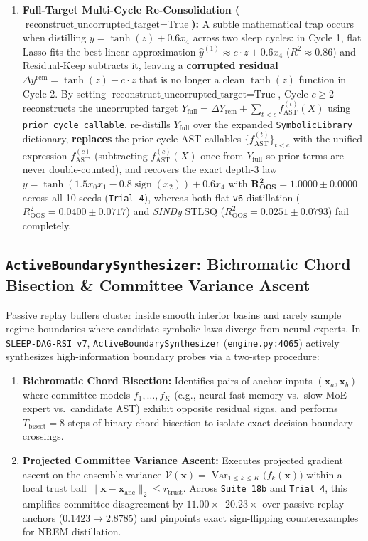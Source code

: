 \documentclass[11pt,a4paper]{article}
\begin{document}
\begin{enumerate}
\item \textbf{Full-Target Multi-Cycle Re-Consolidation ($\text{reconstruct\_uncorrupted\_target}=\text{True}$):}
A subtle mathematical trap occurs when distilling $y = \tanh(z) + 0.6 x_4$ across two sleep cycles: in Cycle 1, flat Lasso fits the best linear approximation $\hat{y}^{(1)} \approx c \cdot z + 0.6 x_4$ ($R^2 \approx 0.86$) and Residual-Keep subtracts it, leaving a \textbf{corrupted residual} $\Delta y^{\text{rem}} = \tanh(z) - c \cdot z$ that is no longer a clean $\tanh(z)$ function in Cycle 2. By setting $\text{reconstruct\_uncorrupted\_target}=\text{True}$, Cycle $c \ge 2$ reconstructs the uncorrupted target $Y_{\text{full}} = \Delta Y_{\text{rem}} + \sum_{t < c} f_{\text{AST}}^{(t)}(X)$ using \texttt{prior\_cycle\_callable}, re-distills $Y_{\text{full}}$ over the expanded \texttt{SymbolicLibrary} dictionary, \textbf{replaces} the prior-cycle AST callables $\{f_{\text{AST}}^{(t)}\}_{t < c}$ with the unified expression $f_{\text{AST}}^{(c)}$ (subtracting $f_{\text{AST}}^{(c)}(X)$ once from $Y_{\text{full}}$ so prior terms are never double-counted), and recovers the exact depth-3 law $y = \tanh(1.5 x_0 x_1 - 0.8\operatorname{sign}(x_2)) + 0.6 x_4$ with $\mathbf{R^2_{\text{OOS}} = 1.0000 \pm 0.0000}$ across all 10 seeds (\texttt{Trial 4}), whereas both flat \texttt{v6} distillation ($R^2_{\text{OOS}} = 0.0400 \pm 0.0717$) and \emph{SINDy} STLSQ ($R^2_{\text{OOS}} = 0.0251 \pm 0.0793$) fail completely.
\end{enumerate}

\subsection{\texttt{ActiveBoundarySynthesizer}: Bichromatic Chord Bisection \& Committee Variance Ascent}

Passive replay buffers cluster inside smooth interior basins and rarely sample regime boundaries where candidate symbolic laws diverge from neural experts. In \texttt{SLEEP-DAG-RSI v7}, \texttt{ActiveBoundarySynthesizer} (\texttt{engine.py:4065}) actively synthesizes high-information boundary probes via a two-step procedure:
\begin{enumerate}
\item \textbf{Bichromatic Chord Bisection:} Identifies pairs of anchor inputs $(\mathbf{x}_a, \mathbf{x}_b)$ where committee models $f_1, \dots, f_K$ (e.g., neural fast memory vs.\ slow MoE expert vs.\ candidate AST) exhibit opposite residual signs, and performs $T_{\text{bisect}} = 8$ steps of binary chord bisection to isolate exact decision-boundary crossings.
\item \textbf{Projected Committee Variance Ascent:} Executes projected gradient ascent on the ensemble variance $\mathcal{V}(\mathbf{x}) = \operatorname{Var}_{1 \le k \le K}\bigl(f_k(\mathbf{x})\bigr)$ within a local trust ball $\|\mathbf{x} - \mathbf{x}_{\text{anc}}\|_2 \le r_{\text{trust}}$. Across \texttt{Suite 18b} and \texttt{Trial 4}, this amplifies committee disagreement by $\mathbf{11.00\times\text{--}20.23\times}$ over passive replay anchors ($0.1423 \to 2.8785$) and pinpoints exact sign-flipping counterexamples for NREM distillation.
\end{enumerate}
\end{document}
